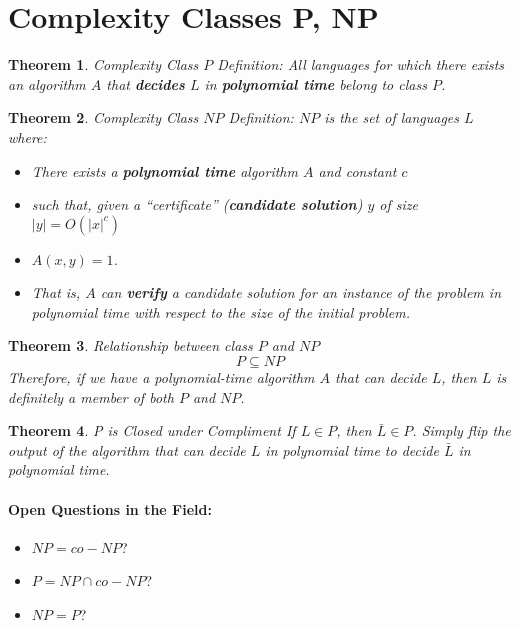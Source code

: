 \documentclass[a4paper,12pt]{report}
\newtheorem{theorem}{Theorem}
\begin{document}
\section{Complexity Classes P, NP}

\begin{theorem}{Complexity Class $P$ Definition: }
All languages for which there exists an algorithm $A$ that \textbf{decides} $L$ in \textbf{polynomial time} belong to class $P$.
\end{theorem}


\begin{theorem}{Complexity Class $NP$ Definition: }
$NP$ is the set of languages $L$ where: 
\begin{itemize}
\item There exists a \textbf{polynomial time} algorithm $A$ and constant $c$
\item such that, given a ``certificate'' (\textbf{candidate solution}) $y$ of size $|y| = O(|x|^c)$
\item $A(x,y) = 1$. 
\item That is, $A$ can \textbf{verify} a candidate solution for an instance of the problem in polynomial time with respect to the size of the initial problem. 
\end{itemize}
\end{theorem}


\begin{theorem}{Relationship between class $P$ and $NP$}
\begin{equation}
P\subseteq NP
\end{equation}
Therefore, if we have a polynomial-time algorithm $A$ that can decide $L$, then $L$ is definitely a member of both $P$ and $NP$. 
\end{theorem}


\begin{theorem}{P is Closed under Compliment}
If $L\in P$, then $\bar L \in P$. Simply flip the output of the algorithm that can decide $L$ in polynomial time to decide $\bar L$ in polynomial time. 
\end{theorem}



\paragraph{Open Questions in the Field: } 
\begin{itemize}
\item $NP = co-NP$?
\item $P=NP\cap co-NP$?
\item $NP = P$?
\end{itemize}
\end{document}
